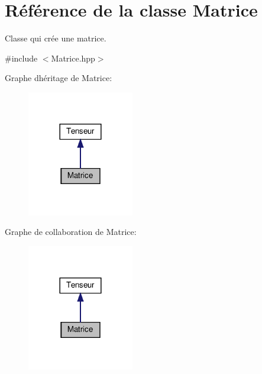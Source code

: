\hypertarget{class_matrice}{}\section{Référence de la classe Matrice}
\label{class_matrice}


Classe qui crée une matrice.  




{\ttfamily \#include $<$Matrice.\+hpp$>$}



Graphe d\textquotesingle{}héritage de Matrice\+:\nopagebreak
\begin{figure}[H]
\begin{center}
\leavevmode
\includegraphics[width=132pt]{class_matrice__inherit__graph}
\end{center}
\end{figure}


Graphe de collaboration de Matrice\+:\nopagebreak
\begin{figure}[H]
\begin{center}
\leavevmode
\includegraphics[width=132pt]{class_matrice__coll__graph}
\end{center}
\end{figure}
